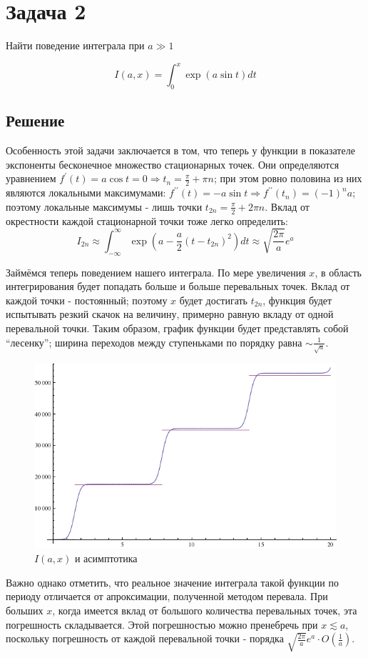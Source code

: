 \documentclass[a4paper,12pt]{article}
\begin{document}
\section{Задача 2}

Найти поведение интеграла при $a \gg 1$

\[
I(a,x)=\int_{0}^{x}\exp(a\sin t)dt
\]


\subsection{Решение}

Особенность этой задачи заключается в том, что теперь у функции в
показателе экспоненты бесконечное множество стационарных точек. Они
определяются уравнением $f^{\prime}(t)=a\cos t=0\Rightarrow t_{n}=\frac{\pi}{2}+\pi n$;
при этом ровно половина из них являются локальными максимумами: $f^{\prime\prime}(t)=-a\sin t\Rightarrow f^{\prime\prime}(t_{n})=\left(-1\right)^{n}a$;
поэтому локальные максимумы - лишь точки $t_{2n}=\frac{\pi}{2}+2\pi n$.
Вклад от окрестности каждой стационарной точки тоже легко определить:
\[
I_{2n}\approx\int_{-\infty}^{\infty}\exp(a-\frac{a}{2}(t-t_{2n})^{2})dt\approx\sqrt{\frac{2\pi}{a}}e^{a}
\]

\noindent
Займёмся теперь поведением нашего интеграла. По мере увеличения $x$,
в область интегрирования будет попадать больше и больше перевальных
точек. Вклад от каждой точки - постоянный; поэтому $x$ будет достигать
$t_{2n}$, функция будет испытывать резкий скачок на величину, примерно
равную вкладу от одной перевальной точки. Таким образом, график функции
будет представлять собой ``лесенку''; ширина переходов между ступеньками по порядку равна
 $\sim\frac{1}{\sqrt{a}}$.

\begin{figure}[h]
	\caption{$I(a,x)$ и асимптотика}
	\centering
	\includegraphics[width=0.5\columnwidth]{ladder.png}
\end{figure}

\noindent
Важно однако отметить, что реальное значение интеграла
такой функции по периоду отличается от апроксимации, полученной методом
перевала. При больших $x$, когда имеется вклад от большого количества
перевальных точек, эта погрешность складывается. Этой погрешностью
можно пренебречь при $x\lesssim a$, поскольку погрешность от каждой
перевальной точки - порядка $\sqrt{\frac{2\pi}{a}}e^{a}\cdot O\left(\frac{1}{a}\right)$.
\end{document}
